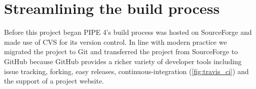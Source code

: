 \section{Streamlining the build process}
Before this project began PIPE 4's build process was hosted on SourceForge and made use of CVS for its version control. In line with modern practice we migrated the project to Git and transferred the project from SourceForge to GitHub because GitHub provides a richer variety of developer tools including issue tracking, forking, easy releases, continuous-integration (\cref{fig:travis_ci}) and the support of a project website.




